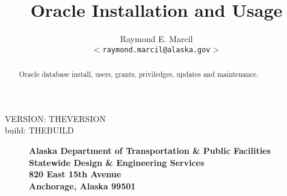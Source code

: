 \documentclass[12pt,letterpaper,dvips]{article}
\title{Oracle Installation and Usage}
\author{Raymond E. Marcil\\
        \texttt{$<$raymond.marcil@alaska.gov$>$}
}
\begin{document}
\maketitle

\begin{center}VERSION: THEVERSION\\
build: THEBUILD
\vspace{10pt}
\end{center}



\begin{abstract}
  \noindent Oracle database install, users, grants, priviledges, 
            updates and maintenance.
\end{abstract}

\vspace{2.5in}

\begin{figure}[h]
        \hspace{0.32in}
        \begin{minipage}[b]{0.16\figwidth}
        \end{minipage}
        \hspace{5pt}
        \begin{minipage}[b]{\figwidth}
                \bf{Alaska Department of Transportation \& Public Facilities}\\
                \bf{Statewide Design \& Engineering Services}\\
                820 East 15th Avenue\\
                Anchorage, Alaska 99501
        \end{minipage}
\end{figure}

\vspace{2.0in}

\newpage
\tableofcontents

\newpage
\end{document}
